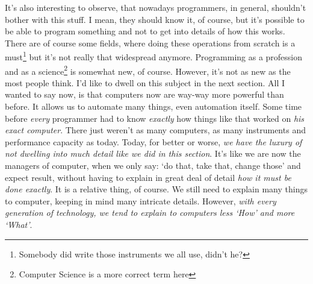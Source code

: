\documentclass[../../what-is-computer.tex]{subfiles}
\begin{document}
    It's also interesting to observe, that nowadays programmers, in general, shouldn't bother with this stuff. I mean, they should know it, of course, but it's possible
    to be able to program something and not to get into details of how this works. There are of course some fields, where doing these operations from scratch 
    is a must\footnote{Somebody did write those instruments we all use, didn't he?} but it's not really that widespread anymore. Programming as a profession and as 
    a science\footnote{Computer Science is a more correct term here} is somewhat new, of course. However, it's not as new as the most people think. I'd like to dwell
    on this subject in the next section. All I wanted to say now, is that computers now are way-way more powerful than before. It allows us to automate many things, even
    automation itself. Some time before \emph{every} programmer had to know \emph{exactly} how things like that worked on \emph{his exact computer}. There just 
    weren't as many computers, as many instruments and performance capacity as today. Today, for better or worse, \emph{we have the luxury of not dwelling into much
    detail like we did in this section}. It's like we are now the managers of computer, when we only say: `do that, take that, change those' and expect result, without
    having to explain in great deal of detail \emph{how it must be done exactly}. It is a relative thing, of course. We still need to explain many things to computer,
    keeping in mind many intricate details. However, \emph{with every generation of technology, we tend to explain to computers less `How' and more `What'}.
\end{document}

